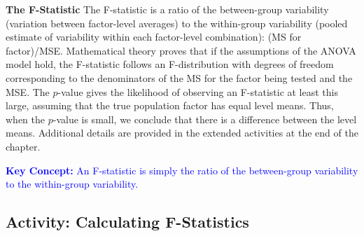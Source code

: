 \documentclass[
]{book}
\begin{document}
\textbf{The F-Statistic} The F-statistic is a ratio of the between-group variability (variation between factor-level averages) to the within-group variability (pooled estimate of variability within each factor-level combination): (MS for factor)/MSE. Mathematical theory proves that if the assumptions of the ANOVA model hold, the F-statistic follows an F-distribution with degrees of freedom corresponding to the denominators of the MS for the factor being tested and the MSE. The \(p\)-value gives the likelihood of observing an F-statistic at least this large, assuming that the true population factor has equal level means. Thus, when the \(p\)-value is small, we conclude that there is a difference between the level means. Additional details are provided in the extended activities at the end of the chapter.

\textbf{\textcolor{blue}{Key Concept:}}
\textcolor{blue}{An F-statistic is simply the ratio of the between-group variability to the within-group variability.}

\hypertarget{activity-calculating-f-statistics}{%
\subsection*{Activity: Calculating F-Statistics}\label{activity-calculating-f-statistics}}
\end{document}

